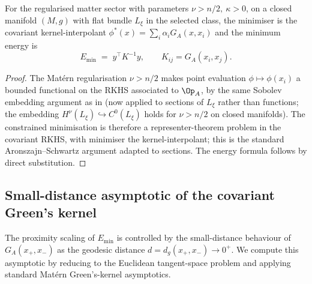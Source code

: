 \begin{lemma}
\label{lem:capacitance-reduction}
For the regularised matter sector with parameters $\nu>n/2,\ \kappa>0$,
on a closed manifold $(M,g)$ with flat bundle $L_\xi$ in the
selected class, the minimiser is the covariant kernel-interpolant
$\phi^*(x)=\sum_i\alpha_i G_A(x,x_i)$ and the minimum energy is
\[
   E_{\min} \;=\; y^\top K^{-1} y,
   \qquad K_{ij}=G_A(x_i,x_j).
\]
\end{lemma}

\begin{proof}
The Mat\'ern regularisation $\nu>n/2$ makes point evaluation
$\phi\mapsto\phi(x_i)$ a bounded functional on the RKHS associated
to $\Op_A$, by the same Sobolev embedding argument as in
\cite[Theorem~13.3]{Vasii2026Paper1} (now applied to sections of $L_\xi$
rather than functions; the embedding $H^\nu(L_\xi)\hookrightarrow
C^0(L_\xi)$ holds for $\nu>n/2$ on closed manifolds). The
constrained minimisation is therefore a representer-theorem problem
in the covariant RKHS, with minimiser the kernel-interpolant; this
is the standard Aronszajn--Schwartz argument
\cite{Aronszajn1950} adapted to sections.
The energy formula follows by direct substitution.
\end{proof}

\subsection{Small-distance asymptotic of the covariant Green's kernel}
\label{ssec:kernel-asymptotic}

The proximity scaling of $E_{\min}$ is controlled by the
small-distance behaviour of $G_A(x_+,x_-)$ as the geodesic distance
$d=d_g(x_+,x_-)\to 0^+$. We compute this asymptotic by reducing to
the Euclidean tangent-space problem and applying standard Mat\'ern
Green's-kernel asymptotics.


